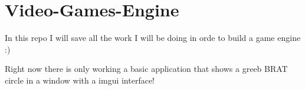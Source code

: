 \chapter{Video-\/\+Games-\/\+Engine}
\hypertarget{index}{}\label{index}
\label{index_md__2home_2jaimemas_2dev_2videogames_2Video-Games-Engine_2README}%
%


In this repo I will save all the work I will be doing in orde to build a game engine \+:)

Right now there is only working a basic application that show\textquotesingle{}s a greeb BRAT circle in a window with a imgui interface!  